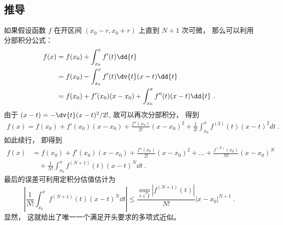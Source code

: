 \subsection{推导}
如果假设函数 $f$ 在开区间 $(x_0-r,x_0+r)$ 上直到 $N+1$ 次可微， 那么可以利用分部积分公式：
\begin{equation}
\begin{aligned}
f(x)
&=f(x_0)+\int_{x_0}^{x}f'(t)\dd{t}\\
&=f(x_0)-\int_{x_0}^{x}f'(t)\dv{t}(x-t) \dd{t}\\
&=f(x_0)+f'(x_0)(x-x_0)+\int_{x_0}^{x}f''(t)(x-t) \dd{t}~.
\end{aligned}
\end{equation}
由于 $(x-t)=-\dv{t} (x-t)^2/2!$, 故可以再次分部积分， 得到
\begin{equation}
\begin{aligned}
f(x)
=f(x_0)+f'(x_0)(x-x_0)+\frac{f''(x_0)}{2!}(x-x_0)^2
+\frac{1}{2!}\int_{x_0}^{x}f^{(3)}(t)(x-t)^2dt~.
\end{aligned}
\end{equation}
如此续行， 即得到
\begin{equation}\label{eq_Tayl_4}
\begin{aligned}
f(x)
&=f(x_0)+f'(x_0)(x-x_0)+\frac{f''(x_0)}{2!}(x-x_0)^2+...+\frac{f^{(N)}(x_0)}{N!}(x-x_0)^N\\
&\quad+\frac{1}{N!}\int_{x_0}^{x}f^{(N+1)}(t)(x-t)^{N} \dd{t}~.
\end{aligned}
\end{equation}
最后的误差可利用定积分估值估计为
\begin{equation}
\left|\frac{1}{N!}\int_{x_0}^{x}f^{(N+1)}(t)(x-t)^{N} \dd{t} \right|
\leq\frac{\sup_{t\in I}|f^{(N+1)}(t)|}{N!}|x-x_0|^{N+1}~.
\end{equation}
显然， 这就给出了唯一一个满足开头要求的多项式近似。
